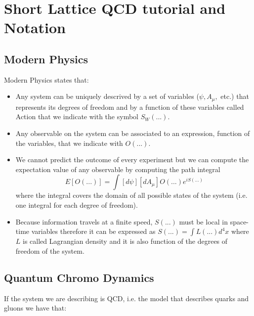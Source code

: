 \section{Short Lattice QCD tutorial and Notation}

\subsection{Modern Physics}

Modern Physics states that:

\begin{itemize}
\item  Any system can be uniquely descrived by a set of variables ($\psi
,A_\mu ,$ etc.) that represents its degrees of freedom and by a function of
these variables called Action that we indicate with the symbol $S_W(...)$.

\item  Any observable on the system can be associated to an expression,
function of the variables, that we indicate with $O(...)$.

\item  We cannot predict the outcome of every experiment but we can compute
the expectation value of any observable by computing the path integral 
\[
E[O(...)]=\int [d\psi ][dA_\mu ]O(...)e^{iS(...)}
\]
where the integral covers the domain of all possible states of the system
(i.e. one integral for each degree of freedom).

\item  Because information travels at a finite speed, $S(...)$ must be local
in space-time variables therefore it can be expressed as $S(...)=\int
L(...)d^4x$ where $L$ is called Lagrangian density and it is also function
of the degrees of freedom of the system.
\end{itemize}

\subsection{Quantum Chromo Dynamics}

If the system we are describing is QCD, i.e. the model that describes quarks
and gluons we have that:

